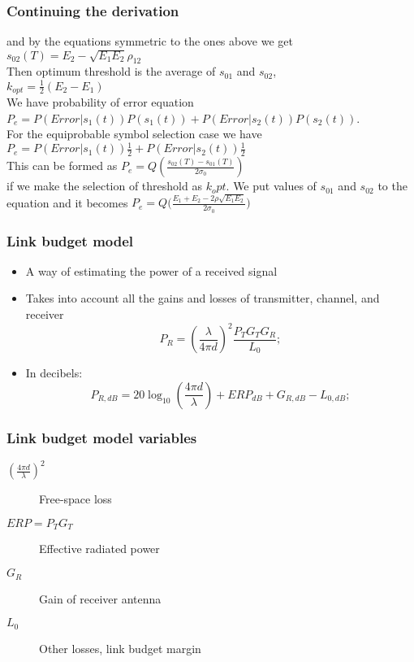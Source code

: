 \documentclass{beamer}
\begin{document}
\begin{frame}
\frametitle{ Continuing the derivation}
and by the equations symmetric to the ones above we get
$ s_{02}(T)=E_2 - \sqrt{E_1 E_2} \rho_{12}$\\
Then optimum threshold is the average of $s_{01}$ and $s_{02}$,\\
$ k_{opt}=\frac{1}{2}(E_2 - E_1)$\\
We have probability of error equation
$P_e = P(Error|s_1(t)) P(s_1(t)) + P(Error|s_2(t)) P(s_2(t))$.\\
For the equiprobable symbol selection case we have \\
$P_e = P(Error|s_1(t)) \frac{1}{2} + P(Error|s_2(t)) \frac{1}{2}$\\
This can be formed as
$P_e=Q(\frac{s_{02}(T)-s_{01}(T)}{2 \sigma_0})$ \\
if we make the selection of threshold as $k_opt$.
We put values of $s_{01}$ and $s_{02}$ to the equation and it becomes
$P_e=Q(\frac{E_1+E_2-2\rho \sqrt{E_1 E_2}}{2 \sigma_0}\bigg)$

\end{frame}


\begin{frame}
	\frametitle{Link budget model}
	\begin{itemize}
		\item A way of estimating the power of a received signal
		\item Takes into account all the gains and losses of transmitter, channel, and receiver
		\begin{equation}
			P_R = \left(\frac{\lambda}{4 \pi d}\right)^2 \frac{P_T G_T G_R}{L_0};
		\end{equation}
		\item In decibels:
		\begin{equation}
			P_{R, dB} = 20\log_{10}\left(\frac{4 \pi d}{\lambda}\right) + {ERP}_{dB} + G_{R, dB} - L_{0, dB};
		\end{equation}
	\end{itemize}
\end{frame}

\begin{frame}
	\frametitle{Link budget model variables}
	\begin{description}
		\item[$(\frac{4 \pi d}{\lambda})^2$] Free-space loss
		\item[$ERP = P_T G_T$] Effective radiated power
		\item[$G_R$] Gain of receiver antenna
		\item[$L_0$] Other losses, link budget margin
	\end{description}
\end{frame}
\end{document}
